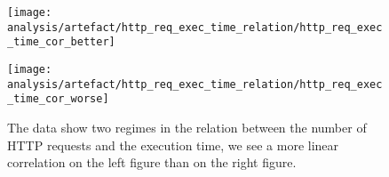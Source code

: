 \begin{figure}[htbp]
    \centering
    \begin{minipage}[t]{0.45\textwidth}
        \centering
        \texttt{[image: analysis/artefact/http\_req\_exec\_time\_relation/http\_req\_exec\_time\_cor\_better]}
        \label{fig:http_req_exec_time_cor_better}
    \end{minipage}
    \hspace{0.05\textwidth}
    \begin{minipage}[t]{0.45\textwidth}
        \centering
        \texttt{[image: analysis/artefact/http\_req\_exec\_time\_relation/http\_req\_exec\_time\_cor\_worse]}
        \label{fig:http_req_exec_time_cor_worse}
    \end{minipage}

    \caption{
        The data show two regimes in the relation between the number of HTTP requests and the execution time, 
        we see a more linear correlation on the left figure than on the right figure.
        }
    \label{fig:http_req_exec_time_cor}
\end{figure}

